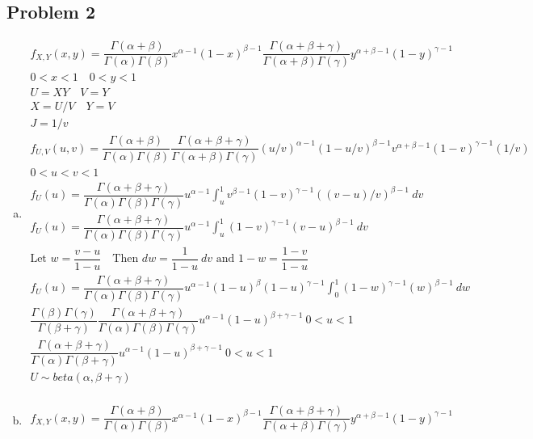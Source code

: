 \documentclass{article}
\begin{document}
\begin{flushleft}
\section*{Problem 2}
\begin{enumerate}[(a)]
\item
\begin{multline*}
f_{X,Y}(x,y)=\dfrac{\Gamma(\alpha+\beta)}{\Gamma(\alpha)\Gamma(\beta)}x^{\alpha-1}(1-x)^{\beta-1}\dfrac{\Gamma(\alpha+\beta+\gamma)}{\Gamma(\alpha+\beta)\Gamma(\gamma)}y^{\alpha+\beta-1}(1-y)^{\gamma-1}\\
0<x<1 \quad 0<y<1\\
U=XY \quad V=Y\\
X=U/V \quad Y=V\\
J=1/v\\
f_{U,V}(u,v)=\dfrac{\Gamma(\alpha+\beta)}{\Gamma(\alpha)\Gamma(\beta)}\dfrac{\Gamma(\alpha+\beta+\gamma)}{\Gamma(\alpha+\beta)\Gamma(\gamma)}(u/v)^{\alpha-1}(1-u/v)^{\beta-1}v^{\alpha+\beta-1}(1-v)^{\gamma-1}(1/v)\\
0<u<v<1\\
f_U(u)=\dfrac{\Gamma(\alpha+\beta+\gamma)}{\Gamma(\alpha)\Gamma(\beta)\Gamma(\gamma)}u^{\alpha-1}\int_{u}^{1}v^{\beta-1}(1-v)^{\gamma-1}((v-u)/v)^{\beta-1} \ dv\\
f_U(u)=\dfrac{\Gamma(\alpha+\beta+\gamma)}{\Gamma(\alpha)\Gamma(\beta)\Gamma(\gamma)}u^{\alpha-1}\int_{u}^{1}(1-v)^{\gamma-1}(v-u)^{\beta-1} \ dv\\
\text{Let } w=\dfrac{v-u}{1-u} \quad \text{Then } dw=\dfrac{1}{1-u} \ dv \text{ and } 1-w=\dfrac{1-v}{1-u}\\
f_U(u)=\dfrac{\Gamma(\alpha+\beta+\gamma)}{\Gamma(\alpha)\Gamma(\beta)\Gamma(\gamma)}u^{\alpha-1}(1-u)^{\beta}(1-u)^{\gamma-1}\int_{0}^{1}(1-w)^{\gamma-1}(w)^{\beta-1} \ dw\\
\dfrac{\Gamma(\beta)\Gamma(\gamma)}{\Gamma(\beta+\gamma)}\dfrac{\Gamma(\alpha+\beta+\gamma)}{\Gamma(\alpha)\Gamma(\beta)\Gamma(\gamma)}u^{\alpha-1}(1-u)^{\beta+\gamma-1} \ 0<u<1\\
\dfrac{\Gamma(\alpha+\beta+\gamma)}{\Gamma(\alpha)\Gamma(\beta+\gamma)}u^{\alpha-1}(1-u)^{\beta+\gamma-1} \ 0<u<1\\
U\sim beta(\alpha,\beta+\gamma)\\
\end{multline*}
\item
\begin{multline*}
f_{X,Y}(x,y)=\dfrac{\Gamma(\alpha+\beta)}{\Gamma(\alpha)\Gamma(\beta)}x^{\alpha-1}(1-x)^{\beta-1}\dfrac{\Gamma(\alpha+\beta+\gamma)}{\Gamma(\alpha+\beta)\Gamma(\gamma)}y^{\alpha+\beta-1}(1-y)^{\gamma-1}\\

\end{multline*}
\end{enumerate}
\end{flushleft}
\end{document}
